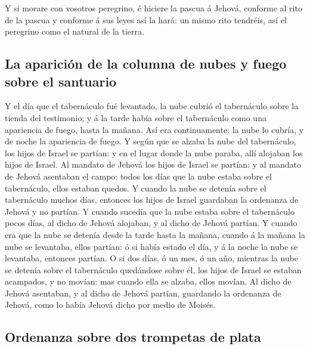  Y si morare con vosotros peregrino, é hiciere la pascua á
Jehová, conforme al rito de la pascua y conforme á sus leyes así la
hará: un mismo rito tendréis, así el peregrino como el natural de la
tierra.

\hypertarget{la-apariciuxf3n-de-la-columna-de-nubes-y-fuego-sobre-el-santuario}{%
\subsection{La aparición de la columna de nubes y fuego sobre el
santuario}\label{la-apariciuxf3n-de-la-columna-de-nubes-y-fuego-sobre-el-santuario}}

 Y el día que el tabernáculo fué levantado, la nube cubrió
el tabernáculo sobre la tienda del testimonio; y á la tarde había sobre
el tabernáculo como una apariencia de fuego, hasta la mañana.
 Así era continuamente: la nube lo cubría, y de noche la
apariencia de fuego.  Y según que se alzaba la nube del
tabernáculo, los hijos de Israel se partían: y en el lugar donde la nube
paraba, allí alojaban los hijos de Israel.  Al mandato de
Jehová los hijos de Israel se partían: y al mandato de Jehová asentaban
el campo: todos los días que la nube estaba sobre el tabernáculo, ellos
estaban quedos.  Y cuando la nube se detenía sobre el
tabernáculo muchos días, entonces los hijos de Israel guardaban la
ordenanza de Jehová y no partían.  Y cuando sucedía que la
nube estaba sobre el tabernáculo pocos días, al dicho de Jehová
alojaban, y al dicho de Jehová partían.  Y cuando era que
la nube se detenía desde la tarde hasta la mañana, cuando á la mañana la
nube se levantaba, ellos partían: ó si había estado el día, y á la noche
la nube se levantaba, entonces partían.  O si dos días, ó
un mes, ó un año, mientras la nube se detenía sobre el tabernáculo
quedándose sobre él, los hijos de Israel se estaban acampados, y no
movían: mas cuando ella se alzaba, ellos movían.  Al dicho
de Jehová asentaban, y al dicho de Jehová partían, guardando la
ordenanza de Jehová, como lo había Jehová dicho por medio de Moisés.

\hypertarget{ordenanza-sobre-dos-trompetas-de-plata}{%
\subsection{Ordenanza sobre dos trompetas de
plata}\label{ordenanza-sobre-dos-trompetas-de-plata}}

